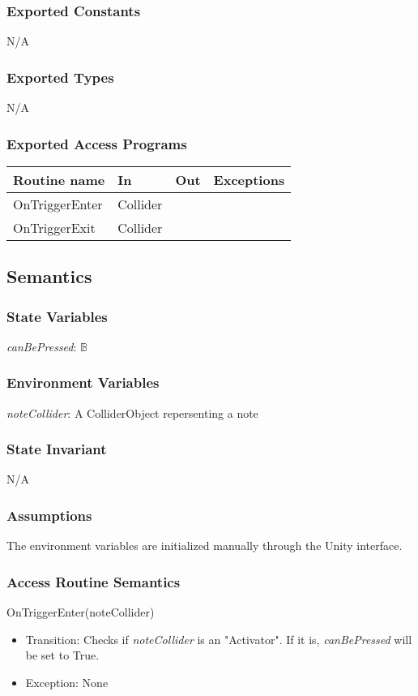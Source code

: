 \documentclass[12pt]{article}
\begin{document}
\subsubsection {Exported Constants}
N/A
\subsubsection {Exported Types}
N/A

\subsubsection {Exported Access Programs}

\begin{tabular}{| l | l | l | l |}
\hline
\textbf{Routine name} & \textbf{In} & \textbf{Out} & \textbf{Exceptions}\\
\hline
OnTriggerEnter & Collider & &\\
\hline
OnTriggerExit & Collider & &\\
\hline
\end{tabular}

\subsection {Semantics}

\subsubsection {State Variables}
\textit{canBePressed}: $\mathbb{B}$ \\

\subsubsection {Environment Variables}
\textit{noteCollider}: A ColliderObject repersenting a note

\subsubsection {State Invariant}
N/A

\subsubsection {Assumptions}
The environment variables are initialized manually through the Unity interface.

\subsubsection {Access Routine Semantics}
\noindent OnTriggerEnter(noteCollider)
\begin{itemize}
    \item Transition: Checks if \textit{noteCollider} is an "Activator". If it is, \textit{canBePressed} will be set to True.
    \item Exception: None
\end{itemize}
\end{document}
